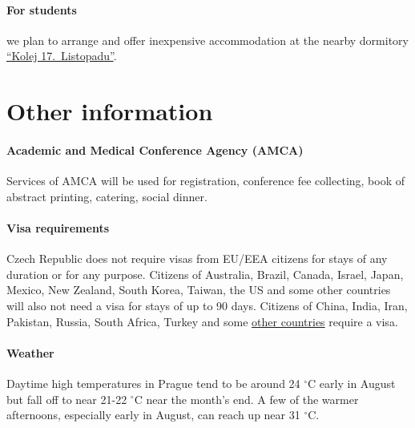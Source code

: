 \documentclass[12pt]{extarticle}
\begin{document}
\paragraph{For students} we plan to arrange and offer inexpensive accommodation at the nearby dormitory \href{https://kam.cuni.cz/KAMEN-54.html}{``Kolej 17.\ Listopadu''}.

\section*{Other information}

\paragraph{Academic and Medical Conference Agency (AMCA)}
Services of AMCA will be used for registration, conference fee
collecting, book of abstract printing, catering, social dinner.

\paragraph{Visa requirements}
Czech Republic does not require visas from EU/EEA citizens for stays
of any duration or for any purpose. Citizens of Australia, Brazil,
Canada, Israel, Japan, Mexico, New Zealand, South Korea, Taiwan, the
US and some other countries will also not need a visa for stays of
up to 90 days. Citizens of China, India, Iran, Pakistan, Russia, South
Africa, Turkey and some
\href{https://www.mzv.cz/jnp/en/information_for_aliens/short_stay_visa/list_of_states_whose_citizens_are/index.html}{other countries} require a visa.

\paragraph{Weather}
Daytime high temperatures in Prague tend to be around 24 ${}^\circ$C early in August but fall off to near
21-22 ${}^\circ$C near the month's end. A few of the warmer afternoons, especially early in August, can reach
up near 31 ${}^\circ$C.
\end{document}
